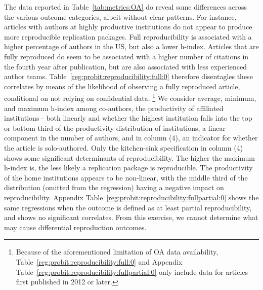 \documentclass{cje} %
\theoremstyle{plain}%
\theoremstyle{definition}
\theoremstyle{remark}
\begin{document}
The data reported in Table~\ref{tab:metrics:OA} do  reveal  some differences across the various outcome categories, albeit without clear patterns. For instance, articles with authors at highly productive institutions do not appear to produce more reproducible replication packages. Full reproducibility is associated with a higher percentage of authors in the US, but also a lower h-index. Articles that are fully reproduced do seem to be associated with a higher number of citations in the fourth year after publication, but are also associated with less experienced author teams. Table~\ref{reg:probit:reproducibility:full:0} therefore disentagles these correlates by means of the likelihood of observing a fully reproduced article, conditional on not relying on confidential data.%
%
\footnote{Because of the aforementioned limitation of OA data availability, Table~\ref{reg:probit:reproducibility:full:0} and Appendix Table~\ref{reg:probit:reproducibility:fullpartial:0} only include data for articles first published in 2012 or later.}
%
We consider average, minimum, and maximum h-index among co-authors, the productivity of affiliated institutions - both linearly and whether the highest institution falls into the top or bottom third of the productivity distribution of institutions, a linear component in the number of authors, and in column (4), an indicator for whether the article is solo-authored. Only the kitchen-sink specification in column (4) shows some significant determinants of reproducibility. The higher the maximum h-index is, the less likely a replication package is reproducible. The productivity of the home institutions appears to be non-linear, with the middle third of the distribution (omitted from the regression) having a negative impact on reproducibility. Appendix Table~\ref{reg:probit:reproducibility:fullpartial:0} shows the same regressions when the outcome is defined as at least partial reproducibility, and shows no significant correlates. From this exercise, we cannot determine what may cause differential reproduction outcomes.
\end{document}
